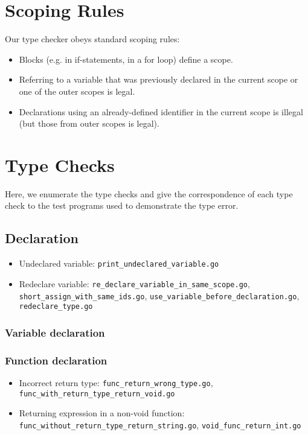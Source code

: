 \documentclass{article}
\begin{document}
\section{Scoping Rules}

Our type checker obeys standard scoping rules:

\begin{itemize}
    \item Blocks (e.g. in if-statements, in a for loop) define a scope.
    \item Referring to a variable that was previously declared in the current scope or one of the outer scopes is legal.
    \item Declarations using an already-defined identifier in the current scope is illegal (but those from outer scopes is legal).
\end{itemize}

\section{Type Checks}

Here, we enumerate the type checks and give the correspondence of each type check to the test programs used to demonstrate the type error.

\subsection{Declaration}

\begin{itemize}
\item Undeclared variable: \texttt{print\_undeclared\_variable.go}
\item Redeclare variable: \texttt{re\_declare\_variable\_in\_same\_scope.go}, \texttt{short\_assign\_with\_same\_ids.go}, \texttt{use\_variable\_before\_declaration.go}, \texttt{redeclare\_type.go}
\end{itemize}

\subsubsection{Variable declaration}

\subsubsection{Function declaration}

\begin{itemize}
\item Incorrect return type: \texttt{func\_return\_wrong\_type.go}, \texttt{func\_with\_return\_type\_return\_void.go}
\item Returning expression in a non-void function: \texttt{func\_without\_return\_type\_return\_string.go}, \texttt{void\_func\_return\_int.go}
\end{itemize}
\end{document}
